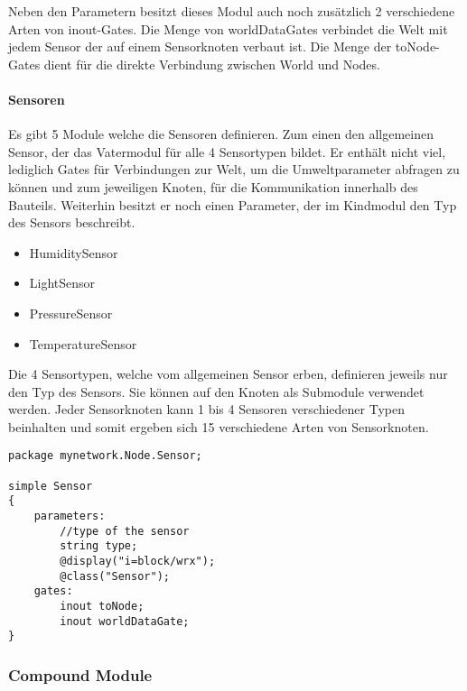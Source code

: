 Neben den Parametern besitzt dieses Modul auch noch zusätzlich 2 verschiedene Arten von inout-Gates. Die Menge von worldDataGates verbindet die Welt mit jedem Sensor der auf einem Sensorknoten verbaut ist. Die Menge der toNode-Gates dient für die direkte Verbindung zwischen World und Nodes.

\paragraph{Sensoren}

Es gibt 5 Module welche die Sensoren definieren. Zum einen den allgemeinen Sensor, der das Vatermodul für alle 4 Sensortypen bildet. Er enthält nicht viel, lediglich Gates für Verbindungen zur Welt, um die Umweltparameter abfragen zu können und zum jeweiligen Knoten, für die Kommunikation innerhalb des Bauteils. Weiterhin besitzt er noch einen Parameter, der im Kindmodul den Typ des Sensors beschreibt.

\begin{multicols}{2}
\begin{itemize}
\item HumiditySensor
\item LightSensor
\item PressureSensor
\item TemperatureSensor
\end{itemize}
\end{multicols}

Die 4 Sensortypen, welche vom allgemeinen Sensor erben, definieren jeweils nur den Typ des Sensors. Sie können auf den Knoten als Submodule verwendet werden. Jeder Sensorknoten kann 1 bis 4 Sensoren verschiedener Typen beinhalten und somit ergeben sich 15 verschiedene Arten von Sensorknoten.

\begin{minipage}{\textwidth}
\begin{lstlisting}[language=ned,caption={Sensor},label=lst:Sensor]
package mynetwork.Node.Sensor;

simple Sensor 
{
    parameters:
        //type of the sensor
        string type;
	    @display("i=block/wrx");
	    @class("Sensor");
	gates: 
	    inout toNode;
	    inout worldDataGate;
}
\end{lstlisting}
\end{minipage}

\subsubsection{Compound Module}

